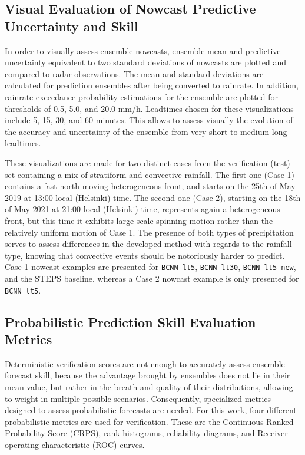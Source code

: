 \subsection{Visual Evaluation of Nowcast Predictive Uncertainty and Skill}
\label{section:viz_methods}

In order to visually assess ensemble nowcasts, ensemble mean and predictive uncertainty equivalent to two standard deviations of nowcasts are plotted and compared to radar observations. The mean and standard deviations are calculated for prediction ensembles after being converted to rainrate. In addition, rainrate exceedance probability estimations for the ensemble are plotted for thresholds of 0.5, 5.0, and 20.0 mm/h. Leadtimes chosen for these visualizations include 5, 15, 30, and 60 minutes. This allows to assess visually the evolution of the accuracy and uncertainty of the ensemble from very short to medium-long leadtimes. 

These visualizations are made for two distinct cases from the verification (test) set containing a mix of stratiform and convective rainfall. The first one (Case 1) contains a fast north-moving heterogeneous front, and starts on the 25th of May 2019 at 13:00 local (Helsinki) time. The second one (Case 2), starting on the 18th of May 2021 at 21:00 local (Helsinki) time, represents again a heterogeneous front, but this time it exhibits large scale spinning motion rather than the relatively uniform motion of Case 1. The presence of both types of precipitation serves to assess differences in the developed method with regards to the rainfall type, knowing that convective events should be notoriously harder to predict. Case 1 nowcast examples are presented for \texttt{BCNN lt5}, \texttt{BCNN lt30}, \texttt{BCNN lt5 new}, and the STEPS baseline, whereas a Case 2 nowcast example is only presented for \texttt{BCNN lt5}.

\subsection{Probabilistic Prediction Skill Evaluation Metrics}

\label{section:prob_metric}
Deterministic verification scores are not enough to accurately assess ensemble forecast skill, because the advantage brought by ensembles does not lie in their mean value, but rather in the breath and quality of their distributions, allowing to weight in multiple possible scenarios. Consequently, specialized metrics designed to assess probabilistic forecasts are needed. 
For this work, four different probabilistic metrics are used for verification. These are the Continuous Ranked Probability Score (CRPS), rank histograms, reliability diagrams, and Receiver operating characteristic (ROC) curves. 

